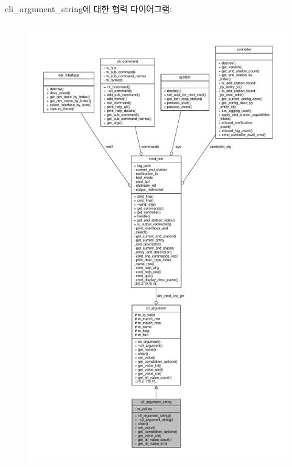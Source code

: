 cli\+\_\+argument\+\_\+string에 대한 협력 다이어그램\+:
\nopagebreak
\begin{figure}[H]
\begin{center}
\leavevmode
\includegraphics[height=550pt]{classcli__argument__string__coll__graph}
\end{center}
\end{figure}
